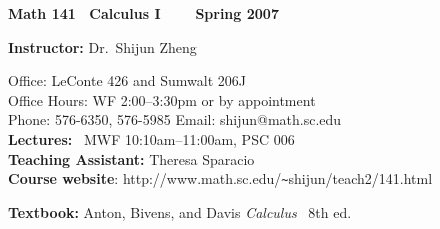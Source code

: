 \documentclass[11pt]{article}
\newcommand{\nd}{\noindent}
\begin{document}
\large 
\begin{center}
{\bf Math 141 ~Calculus I %
 ~~~ Spring 2007}
\end{center}


\bigskip
\noindent
{\bf Instructor:} Dr.~Shijun Zheng\\


\noindent
{Office: {LeConte 426} and Sumwalt 206J\\

\nd
{Office Hours:}  {WF 2:00--3:30pm or by appointment}\\

\nd
{Phone:}  {576-6350},  576-5985\quad  
{Email:}  {shijun@math.sc.edu }\\


\nd
{\bf Lectures:} ~MWF 10:10am--11:00am, PSC 006\\

\noindent
{\bf Teaching Assistant:} Theresa Sparacio\\

\nd
{\bf Course website}: http://www.math.sc.edu/{\verb+~+}shijun/teach2/141.html 


\bigskip
\noindent
{\bf Textbook:} Anton, Bivens, and Davis {\em Calculus} ~8th ed.


}
\end{document}
